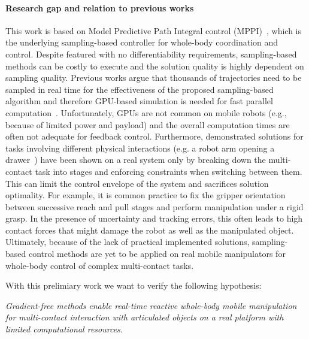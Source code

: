 \paragraph{Research gap and relation to previous works}  This work is based on Model Predictive Path Integral control (MPPI)~\cite{williams_information_2017}, which is the underlying sampling-based controller for whole-body coordination and control. Despite featured with no differentiability requirements, sampling-based methods can be costly to execute and the solution quality is highly dependent on sampling quality. Previous works argue that thousands of trajectories need to be sampled in real time for the effectiveness of the proposed sampling-based algorithm and therefore GPU-based simulation is needed for fast parallel computation~\cite{williams_model_2017}. Unfortunately, GPUs are not common on mobile robots (e.g., because of limited power and payload) and the overall computation times are often not adequate for feedback control. 
Furthermore, demonstrated solutions for tasks involving different physical interactions (e.g. a robot arm opening a drawer~\cite{abraham_model-based_2020}) have been shown on a real system only by breaking down the multi-contact task into stages and enforcing constraints when switching between them. 
This can limit the control envelope of the system and sacrifices solution optimality. For example, it is common practice to fix the gripper orientation between successive reach and pull stages and perform manipulation under a rigid grasp. In the presence of uncertainty and tracking errors, this often leads to high contact forces that might damage the robot as well as the manipulated object.
Ultimately, because of the lack of practical implemented solutions, sampling-based control methods are yet to be applied on real mobile manipulators for whole-body control of complex multi-contact tasks.   

With this prelimiary work we want to verify the following hypothesis:
\begin{displayquote}
\textit{Gradient-free methods enable real-time reactive whole-body mobile manipulation for multi-contact interaction with articulated objects on a real platform with limited computational resources.}
\end{displayquote}

